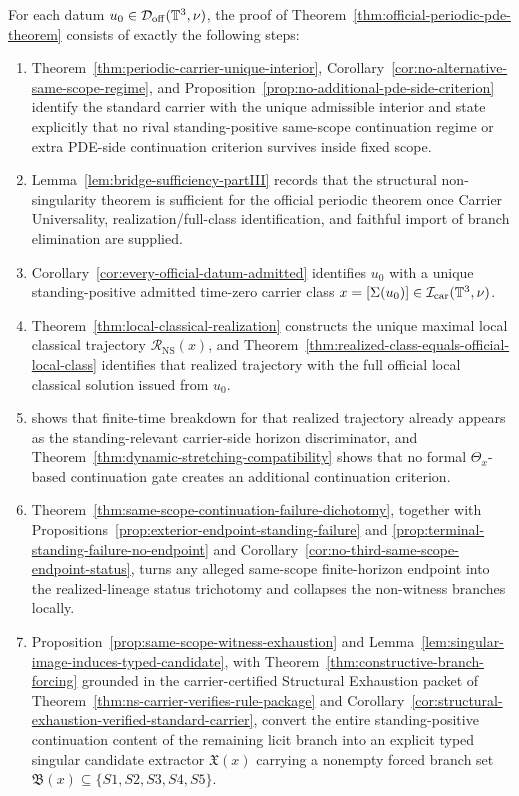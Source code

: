 \begin{proposition}\label{prop:compressed-dependency-chain-official}
For each datum $u_0\in\mathcal D_{\mathrm{off}}(\mathbb{T}^3,\nu)$, the proof of
Theorem~\ref{thm:official-periodic-pde-theorem} consists of exactly the following steps:
\begin{enumerate}[label=(\roman*), leftmargin=2.2em]
\item Theorem~\ref{thm:periodic-carrier-unique-interior}, Corollary~\ref{cor:no-alternative-same-scope-regime}, and Proposition~\ref{prop:no-additional-pde-side-criterion} identify the standard carrier with the unique admissible interior and state explicitly that no rival standing-positive same-scope continuation regime or extra PDE-side continuation criterion survives inside fixed scope.
\item Lemma~\ref{lem:bridge-sufficiency-partIII} records that the structural non-singularity theorem is sufficient for the official periodic theorem once Carrier Universality, realization/full-class identification, and faithful import of branch elimination are supplied.
\item Corollary~\ref{cor:every-official-datum-admitted} identifies $u_0$ with a unique standing-positive admitted time-zero carrier class $x=[\Sigma(u_0)]\in\mathcal I_{\mathrm{car}}(\mathbb{T}^3,\nu)$.
\item Theorem~\ref{thm:local-classical-realization} constructs the unique maximal local classical trajectory $\mathcal R_{\mathrm{NS}}(x)$, and Theorem~\ref{thm:realized-class-equals-official-local-class} identifies that realized trajectory with the full official local classical solution issued from $u_0$.
\item \HorizonDetectabilityRef{} shows that finite-time breakdown for that realized trajectory already appears as the standing-relevant carrier-side horizon discriminator, and Theorem~\ref{thm:dynamic-stretching-compatibility} shows that no formal $\Theta_x$-based continuation gate creates an additional continuation criterion.
\item Theorem~\ref{thm:same-scope-continuation-failure-dichotomy}, together with Propositions~\ref{prop:exterior-endpoint-standing-failure} and \ref{prop:terminal-standing-failure-no-endpoint} and Corollary~\ref{cor:no-third-same-scope-endpoint-status}, turns any alleged same-scope finite-horizon endpoint into the realized-lineage status trichotomy and collapses the non-witness branches locally.
\item Proposition~\ref{prop:same-scope-witness-exhaustion} and Lemma~\ref{lem:singular-image-induces-typed-candidate}, with Theorem~\ref{thm:constructive-branch-forcing} grounded in the carrier-certified Structural Exhaustion packet of Theorem~\ref{thm:ns-carrier-verifies-rule-package} and Corollary~\ref{cor:structural-exhaustion-verified-standard-carrier}, convert the entire standing-positive continuation content of the remaining licit branch into an explicit typed singular candidate extractor $\mathfrak X(x)$ carrying a nonempty forced branch set $\mathfrak B(x)\subseteq\{S1,S2,S3,S4,S5\}$.

\end{enumerate}
\end{proposition}
